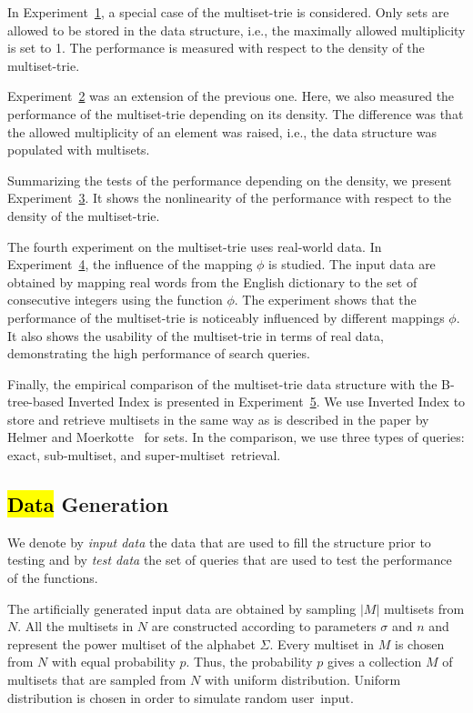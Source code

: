 \documentclass[algorithms,article,accept,pdftex,moreauthors]{Definitions/mdpi}
\begin{document}
In Experiment~\hyperref[s:exp1]{1}, a special case of the multiset-trie is considered. 
Only sets are allowed to be stored in the data structure, i.e., the maximally allowed 
multiplicity is set to 1. The performance is measured with respect to the density 
of the multiset-trie.

Experiment~\hyperref[s:exp2]{2} was an extension of the previous one. Here, 
we also measured the performance of the multiset-trie depending on its density. 
The difference was that the allowed multiplicity of an element was raised, i.e., 
the data structure was populated with multisets. 

Summarizing the tests of the performance depending on the density, we present 
Experiment~\hyperref[s:exp3]{3}. It shows the nonlinearity of the performance 
with respect to the density of the multiset-trie.

The fourth experiment on the multiset-trie uses real-world data. In 
Experiment~\hyperref[s:exp4]{4}, the influence of the mapping $\phi$ is studied. 
The input data are obtained by mapping real words from the English dictionary 
to the set of consecutive integers using the function $\phi.$ The experiment 
shows that the performance of the multiset-trie is noticeably influenced by 
different mappings $\phi.$ It also shows the usability of the multiset-trie in terms 
of real data, demonstrating the high performance of search queries.

Finally, the empirical comparison of the multiset-trie data structure with
the B-tree-based Inverted Index is presented in Experiment~\hyperref[s:exp5]{5}. We use
Inverted Index to store and retrieve multisets in the same way as
is described in the paper by Helmer and Moerkotte~\cite{Helmer2003}
for sets. In the comparison, we use three types of queries: exact,
sub-multiset, and super-multiset~retrieval.

\subsection{\hl{Data} %
 Generation}
We denote by \emph{input data} the data that are used to fill the structure prior 
to testing and by \emph{test data} the set of queries that are used to test the 
performance of the functions.

The artificially generated input data are obtained by sampling $|M|$ multisets 
from $N.$ All the multisets in $N$ are constructed according to parameters 
$\sigma$ and $n$ and represent the power multiset of the alphabet $\Sigma.$ 
Every multiset in $M$ is chosen from $N$ with equal probability $p.$ Thus, the 
probability $p$ gives a collection $M$ of multisets that are sampled from $N$ 
with uniform distribution. Uniform distribution is chosen in order to simulate
random user~input.
\end{document}
